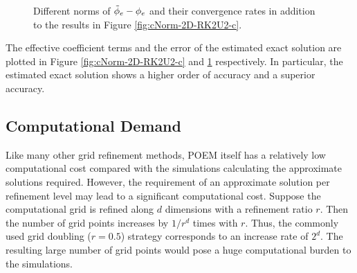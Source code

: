 \begin{figure}[!htb]
\centering
{}
\hskip 20pt
\caption{Different norms of $\Tilde{\phi}_{e} - \phi_{e}$ and their convergence rates in addition to the results in Figure \ref{fig:cNorm-2D-RK2U2-c}.}
\label{fig:es_ex-2D-RK2U2-c}
\end{figure}

The effective coefficient terms and the error of the estimated exact solution are plotted in Figure \ref{fig:cNorm-2D-RK2U2-c} and \ref{fig:es_ex-2D-RK2U2-c} respectively. In particular, the estimated exact solution shows a higher order of accuracy and a superior accuracy.


\subsection{Computational Demand}
Like many other grid refinement methods, POEM itself has a relatively low computational cost compared with the simulations calculating the approximate solutions required. However, the requirement of an approximate solution per refinement level may lead to a significant computational cost. Suppose the computational grid is refined along $d$ dimensions with a refinement ratio $r$. Then the number of grid points increases by $1/r^d$ times with $r$. Thus, the commonly used grid doubling ($r = 0.5$) strategy corresponds to an increase rate of $2^d$. The resulting large number of grid points would pose a huge computational burden to the simulations.

